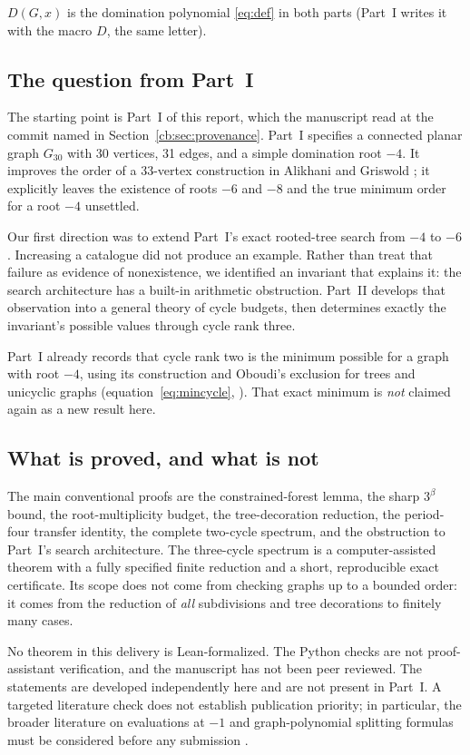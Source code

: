 \documentclass[11pt]{article}
\numberwithin{equation}{section}
\theoremstyle{definition}
\newcommand{\D}{D}
\begin{document}
\(D(G,x)\) is the domination polynomial \eqref{eq:def} in both parts
(Part~I writes it with the macro \(\D\), the same letter).

\subsection{The question from Part~I}
The starting point is Part~I of this report, which the manuscript read at
the commit named in Section~\ref{cb:sec:provenance}. Part~I specifies a
connected planar graph $G_{30}$ with 30 vertices, 31 edges, and a simple
domination root $-4$. It improves the order of a 33-vertex construction in
Alikhani and Griswold \cite{AG}; it explicitly leaves the existence of
roots $-6$ and $-8$ and the true minimum order for a root $-4$ unsettled.

Our first direction was to extend Part~I's exact rooted-tree search
from $-4$ to $-6$. Increasing a catalogue did not produce an example. Rather
than treat that failure as evidence of nonexistence, we identified an
invariant that explains it: the search architecture has a built-in
arithmetic obstruction. Part~II develops that observation into
a general theory of cycle budgets, then determines exactly the invariant's
possible values through cycle rank three.

Part~I already records that cycle rank two is the minimum possible
for a graph with root $-4$, using its construction and Oboudi's
exclusion for trees and unicyclic graphs (equation~\eqref{eq:mincycle},
\cite{Oboudi}). That exact
minimum is \emph{not} claimed again as a new result here.

\subsection{What is proved, and what is not}
The main conventional proofs are the constrained-forest lemma, the sharp
$3^\beta$ bound, the root-multiplicity budget, the tree-decoration reduction,
the period-four transfer identity, the complete two-cycle spectrum, and
the obstruction to Part~I's search architecture. The three-cycle
spectrum is a computer-assisted theorem with a fully specified finite
reduction and a short, reproducible exact certificate. Its scope does not
come from checking graphs up to a bounded order: it comes from the reduction
of \emph{all} subdivisions and tree decorations to finitely many cases.

No theorem in this delivery is Lean-formalized. The Python checks are not
proof-assistant verification, and the manuscript has not been peer reviewed.
The statements are developed independently here and are not present in
Part~I. A targeted literature check does not establish
publication priority; in particular, the broader literature on evaluations
at $-1$ and graph-polynomial splitting formulas must be considered before
any submission \cite{AlikhaniMinusOne,Kotek}.
\end{document}
